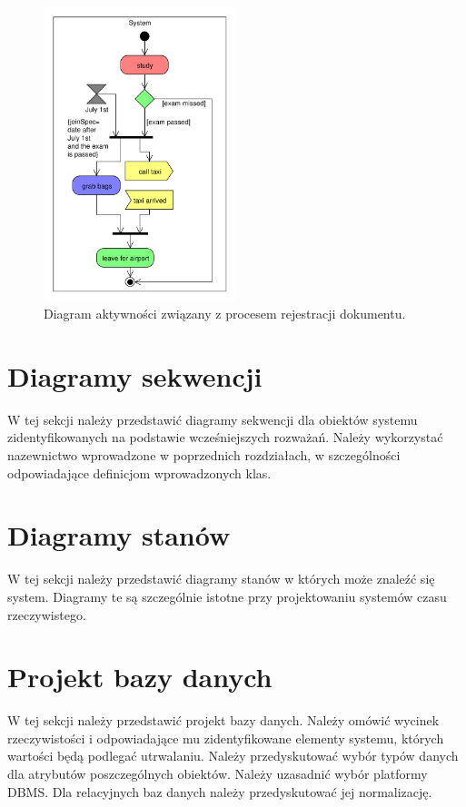 \begin{figure}[h!]
\begin{center}
\includegraphics[width=0.5\textwidth]{aktyw.pdf}
\end{center}
\caption{{\color{dgray}Diagram aktywności związany z procesem rejestracji dokumentu.}} \label{czynnosci_GD}
\end{figure}  

\section{Diagramy sekwencji}

W tej sekcji należy przedstawić diagramy sekwencji dla obiektów systemu zidentyfikowanych na podstawie wcześniejszych rozważań. Należy wykorzystać nazewnictwo wprowadzone w poprzednich rozdziałach, w szczególności odpowiadające definicjom wprowadzonych klas.

\section{Diagramy stanów}

W tej sekcji należy przedstawić diagramy stanów w których może znaleźć się system. Diagramy te są szczególnie istotne przy projektowaniu systemów czasu rzeczywistego. 

\section{Projekt bazy danych}

W tej sekcji należy przedstawić projekt bazy danych. Należy omówić wycinek rzeczywistości i odpowiadające mu zidentyfikowane elementy systemu, których wartości będą podlegać utrwalaniu. Należy przedyskutować wybór typów danych dla atrybutów poszczególnych obiektów. Należy uzasadnić wybór platformy DBMS. Dla relacyjnych baz danych należy przedyskutować jej normalizację.


